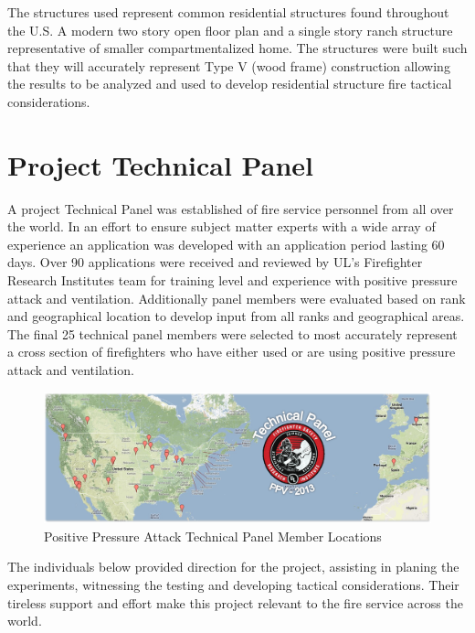 \documentclass{article}
\begin{document}
The structures used represent common residential structures found throughout the U.S. A modern two story open floor plan and a single story ranch structure representative of smaller compartmentalized home. The structures were built such that they will accurately represent Type V (wood frame) construction allowing the results to be analyzed and used to develop residential structure fire tactical considerations. 

\clearpage

\section{Project Technical Panel}

A project Technical Panel was established of fire service personnel from all over the world. In an effort to ensure subject matter experts with a wide array of experience an application was developed with an application period lasting 60 days. Over 90 applications were received and reviewed by UL's Firefighter Research Institutes team for training level and experience with positive pressure attack and ventilation. Additionally panel members were evaluated based on rank and geographical location to develop input from all ranks and geographical areas. The final 25 technical panel members were selected to most accurately represent a cross section of firefighters who have either used or are using positive pressure attack and ventilation. 

\begin{figure}[H]
	\centering
	\includegraphics[width = 5in]{0_Images/Technical_Panel/TechnicalPanelLocations.png} 
	\caption{Positive Pressure Attack Technical Panel Member Locations}
	\label{fig:PanelLocatoins}
\end{figure} 

The individuals below provided direction for the project, assisting in planing the experiments, witnessing the testing and developing tactical considerations. Their tireless support and effort make this project relevant to the fire service across the world. 
\end{document}

